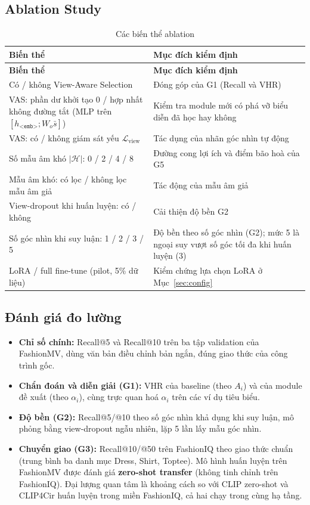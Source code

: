 \documentclass[a4paper]{article}
\newcommand{\emb}{\texttt{<emb>}}
\begin{document}
\subsection{Ablation Study}

\begin{longtable}{L{6.2cm}L{9cm}}
\caption{Các biến thể ablation}\label{tab:abl}\\
\toprule
\textbf{Biến thể} & \textbf{Mục đích kiểm định}\\
\midrule\endfirsthead
\toprule
\textbf{Biến thể} & \textbf{Mục đích kiểm định}\\
\midrule\endhead
Có / không View-Aware Selection & Đóng góp của G1 (Recall và VHR)\\
VAS: phần dư khởi tạo 0 / hợp nhất không đường tắt (MLP trên $[h_{\emb}; W_o\bar{s}]$) & Kiểm tra module mới có phá vỡ biểu diễn đã học hay không\\
VAS: có / không giám sát yếu $\mathcal{L}_{\text{view}}$ & Tác dụng của nhãn góc nhìn tự động\\
Số mẫu âm khó $|\mathcal{H}|$: 0 / 2 / 4 / 8 & Đường cong lợi ích và điểm bão hoà của G5\\
Mẫu âm khó: có lọc / không lọc mẫu âm giả & Tác động của mẫu âm giả\\
View-dropout khi huấn luyện: có / không & Cải thiện độ bền G2\\
Số góc nhìn khi suy luận: 1 / 2 / 3 / 5 & Độ bền theo số góc nhìn (G2); mức 5 là ngoại suy vượt số góc tối đa khi huấn luyện (3)\\
LoRA / full fine-tune (pilot, 5\% dữ liệu) & Kiểm chứng lựa chọn LoRA ở Mục~\ref{sec:config}\\
\bottomrule
\end{longtable}

\subsection{Đánh giá đo lường}
\begin{itemize}
\item \textbf{Chỉ số chính:} Recall@5 và Recall@10 trên ba tập validation của FashionMV, dùng văn bản điều chỉnh bản ngắn, đúng giao thức của công trình gốc.
\item \textbf{Chẩn đoán và diễn giải (G1):} VHR của baseline (theo $A_i$) và của module đề xuất (theo $\alpha_i$), cùng trực quan hoá $\alpha_i$ trên các ví dụ tiêu biểu.
\item \textbf{Độ bền (G2):} Recall@5/@10 theo số góc nhìn khả dụng khi suy luận, mô phỏng bằng view-dropout ngẫu nhiên, lặp 5 lần lấy mẫu góc nhìn.
\item \textbf{Chuyển giao (G3):} Recall@10/@50 trên FashionIQ theo giao thức chuẩn (trung bình ba danh mục Dress, Shirt, Toptee). Mô hình huấn luyện trên FashionMV được đánh giá \textbf{zero-shot transfer} (không tinh chỉnh trên FashionIQ). Đại lượng quan tâm là khoảng cách so với CLIP zero-shot và CLIP4Cir huấn luyện trong miền FashionIQ, cả hai chạy trong cùng hạ tầng.
\end{itemize}
\end{document}
